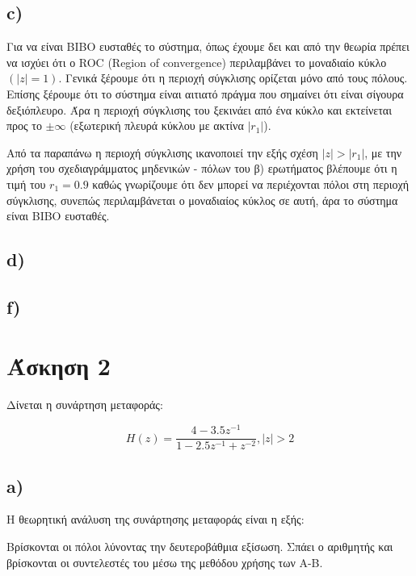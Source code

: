 \documentclass[11pt]{article}
\begin{document}
\subsection*{c)} 
Για να είναι BIBO ευσταθές το σύστημα, όπως έχουμε δει και από την θεωρία πρέπει να ισχύει ότι ο ROC (Region of convergence) περιλαμβάνει το μοναδιαίο κύκλο $(|z|=1)$. Γενικά ξέρουμε ότι η περιοχή σύγκλισης ορίζεται μόνο από τους πόλους. Επίσης ξέρουμε ότι το σύστημα είναι αιτιατό πράγμα που σημαίνει ότι είναι σίγουρα δεξιόπλευρο. Άρα η περιοχή σύγκλισης του ξεκινάει από ένα κύκλο και εκτείνεται προς το $\pm \infty$ (εξωτερική πλευρά κύκλου με ακτίνα $|r_1|$). 
\par \noindent
Από τα παραπάνω η περιοχή σύγκλισης ικανοποιεί την εξής σχέση $|z|>|r_1|$, με την χρήση του σχεδιαγράμματος μηδενικών - πόλων του β) ερωτήματος βλέπουμε ότι η τιμή του $r_1=0.9$ καθώς γνωρίζουμε ότι δεν μπορεί να περιέχονται πόλοι στη περιοχή σύγκλισης, συνεπώς περιλαμβάνεται ο μοναδιαίος κύκλος σε αυτή, άρα το σύστημα είναι BIBO ευσταθές.

\subsection*{d)}

\subsection*{f)}


\section*{Άσκηση 2}
Δίνεται η συνάρτηση μεταφοράς:

$$H(z) = \frac{ 4 - 3.5z^{-1}}{1 - 2.5z^{-1} + z^{-2} } , |z| > 2$$

\subsection*{a)}
Η θεωρητική ανάλυση της συνάρτησης μεταφοράς είναι η εξής:
\par \noindent
Βρίσκονται οι πόλοι λύνοντας την δευτεροβάθμια εξίσωση.
Σπάει ο αριθμητής και βρίσκονται οι συντελεστές του μέσω της μεθόδου χρήσης των Α-Β.
\end{document}
